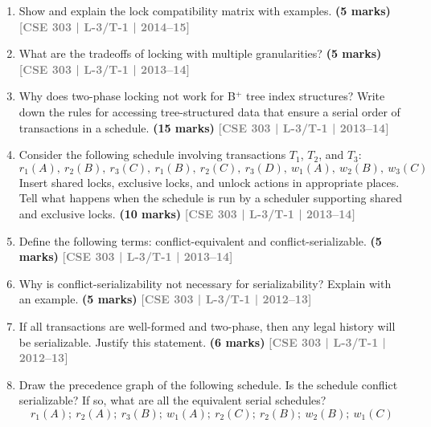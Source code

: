 \documentclass[12pt,a3paper]{article}
\newcommand{\yr}[1]{\hfill\textcolor{gray}{\small\textbf{[#1]}}}
\newcommand{\mk}[1]{\textcolor{orange!70!black}{\small\textbf{(#1 marks)}}}
\begin{document}
\begin{enumerate}
\begin{center}
    \vspace{0.4cm}
    \textbf{Figure 5:} A concurrent schedule of transactions $T_1$, $T_2$ and $T_3$.
\end{center}

\mk{10} \yr{CSE 303 | L-3/T-1 | 2014--15}

\item Show and explain the lock compatibility matrix with examples.
\mk{5} \yr{CSE 303 | L-3/T-1 | 2014--15}

\item What are the tradeoffs of locking with multiple granularities?
\mk{5} \yr{CSE 303 | L-3/T-1 | 2013--14}

\item Why does two-phase locking not work for B$^+$ tree index structures? Write down the rules for accessing tree-structured data that ensure a serial order of transactions in a schedule.
\mk{15} \yr{CSE 303 | L-3/T-1 | 2013--14}

\item Consider the following schedule involving transactions $T_1$, $T_2$, and $T_3$:
\[r_1(A),\ r_2(B),\ r_3(C),\ r_1(B),\ r_2(C),\ r_3(D),\ w_1(A),\ w_2(B),\ w_3(C)\]
Insert shared locks, exclusive locks, and unlock actions in appropriate places. Tell what happens when the schedule is run by a scheduler supporting shared and exclusive locks.
\mk{10} \yr{CSE 303 | L-3/T-1 | 2013--14}

\item Define the following terms: conflict-equivalent and conflict-serializable.
\mk{5} \yr{CSE 303 | L-3/T-1 | 2013--14}

\item Why is conflict-serializability not necessary for serializability? Explain with an example.
\mk{5} \yr{CSE 303 | L-3/T-1 | 2012--13}

\item If all transactions are well-formed and two-phase, then any legal history will be serializable. Justify this statement.
\mk{6} \yr{CSE 303 | L-3/T-1 | 2012--13}

\item Draw the precedence graph of the following schedule. Is the schedule conflict serializable? If so, what are all the equivalent serial schedules?
\[r_1(A);\ r_2(A);\ r_3(B);\ w_1(A);\ r_2(C);\ r_2(B);\ w_2(B);\ w_1(C)\]


\end{enumerate}
\end{document}
